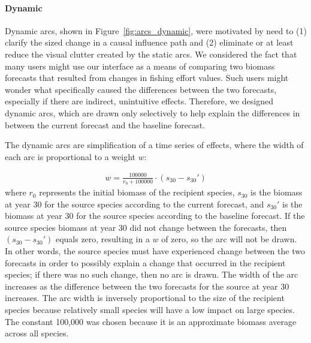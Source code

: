 \paragraph{Dynamic} \label{sec:arcDynamic}

Dynamic arcs, shown in Figure~\ref{fig:arcs_dynamic}, were motivated by need to (1) clarify the sized change in a causal influence path and (2) eliminate or at least reduce the visual clutter created by the static arcs.  We considered the fact that many users might use our interface as a means of comparing two biomass forecasts that resulted from changes in fishing effort values.  Such users might wonder what specifically caused the differences between the two forecasts, especially if there are indirect, unintuitive effects.  Therefore, we designed dynamic arcs, which are drawn only selectively to help explain the differences in between the current forecast and the baseline forecast.

The dynamic arcs are simplification of a time series of effects, where the width of each arc is proportional to a weight $w$:

\begin{align}
w = \frac{100000}{r_{0} + 100000} \cdot (s_{30} - s_{30}')
\end{align}
where $r_{0}$ represents the initial biomass of the recipient species, $s_{30}$ is the biomass at year 30 for the source species according to the current forecast, and $s_{30}'$ is the biomass at year 30 for the source species according to the baseline forecast.  If the source species biomass at year 30 did not change between the forecasts, then $(s_{30} - s_{30}')$ equals zero, resulting in a $w$ of zero, so the arc will not be drawn.  In other words, the source species must have experienced change between the two forecasts in order to possibly explain a change that occurred in the recipient species; if there was no such change, then no arc is drawn.  The width of the arc increases as the difference between the two forecasts for the source at year 30 increases.  The arc width is inversely proportional to the size of the recipient species because relatively small species will have a low impact on large species.  The constant 100,000 was chosen because it is an approximate biomass average across all species.%

